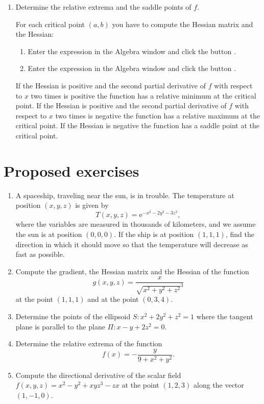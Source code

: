 \begin{enumerate}[leftmargin=*]
\begin{enumerate}
\item Determine the relative extrema and the saddle points of $f$.
\begin{indication}
For each critical point $(a,b)$ you have to compute the Hessian matrix and the Hessian:
\begin{enumerate}
\item Enter the expression  in the Algebra window and click the button .
\item Enter the expression  in the Algebra window and click the  button .
\end{enumerate}
If the Hessian is positive and the second partial derivative of $f$ with respect to $x$ two times is positive the function has a relative minimum at the critical point.
If the Hessian is positive and the second partial derivative of $f$ with respect to $x$ two times is negative the function has a relative maximum at the critical point.
If the Hessian is negative the function has a saddle point at the critical point.
\end{indication}
\end{enumerate}

\end{enumerate}


\section{Proposed exercises}
\begin{enumerate}[leftmargin=*]
\item A spaceship, traveling near the sun, is in trouble.
The temperature at position $(x,y,z)$ is given by 
\[T(x,y,z)=\mbox{e}^{-x^2-2y^2-3z^2},\]
where the variables are measured
in thousands of kilometers, and we assume the sun is at position $(0,0,0)$.
If the ship is at position $(1,1,1)$, find the direction in which it should move so that the temperature will decrease as fast as possible.

\item Compute the gradient, the Hessian matrix and the Hessian of the function
\[
g(x,y,z) = \frac{x}{\sqrt{x^2+y^2+z^2}^3}
\]
at the point $(1,1,1)$ and at the point $(0,3,4)$.

\item Determine the points of the ellipsoid $S: x^2+2y^2+z^2=1$ where the tangent plane is parallel to the plane $\Pi:
x-y+2z^2=0$.

\item Determine the relative extrema of the function 
\[
f(x)=-\frac{y}{9+x^2+y^2}.
\]

\item Compute the directional derivative of the scalar field $f(x,y,z)=x^2-y^2+xyz^3-zx$ at the point $(1,2,3)$ along the vector $(1,-1,0)$.
\end{enumerate}
